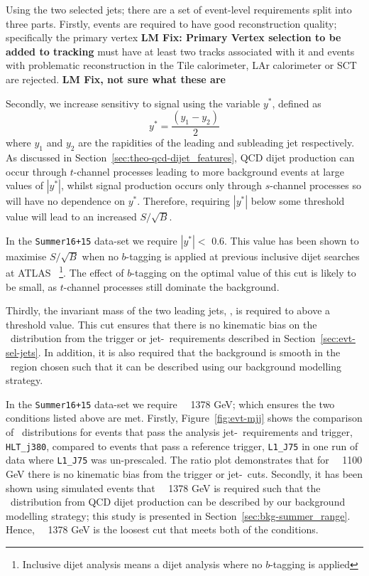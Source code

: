 Using the two selected jets; there are a set of event-level requirements
split into three parts.
Firstly, events are required to have good reconstruction quality;
specifically the primary vertex \textbf{LM Fix: Primary Vertex selection to be added to tracking}
must have at least two tracks associated with it
and events with problematic reconstruction in the Tile calorimeter, LAr calorimeter or SCT are rejected.
\textbf{LM Fix, not sure what these are}

\noindent
Secondly, we increase sensitivy to signal using the 
variable $y^*$, defined as
\begin{equation}
  y^* = \frac{(y_1-y_2)}{2}
\end{equation}
where $y_1$ and $y_2$ are the rapidities of the leading and subleading jet respectively.
As discussed in Section~\ref{sec:theo-qcd-dijet_features}, QCD dijet production can occur through $t$-channel processes leading to more background events at large values of $|y^*|$,
whilst signal production occurs only through $s$-channel processes so will have no dependence on $y^*$.
Therefore, requiring $|y^*|$ below some threshold value will lead to an increased $S/\sqrt{B}$.

In the \verb|Summer16+15| data-set we require $|y^*| <$ 0.6.
This value has been shown to maximise $S/\sqrt{B}$ when no $b$-tagging is applied
at previous inclusive dijet searches at ATLAS~\cite{dijet-mori16_paper}
\footnote{Inclusive dijet analysis means a dijet analysis where no $b$-tagging is applied}.
The effect of $b$-tagging on the optimal value of this cut is likely to be small,
as $t$-channel processes still dominate the background.

Thirdly, the invariant mass of the two leading jets, \mjj, is required to above a threshold value.
This cut ensures that there is no kinematic bias on the \mjj~distribution
from the trigger or jet-\pT~requirements described in Section~\ref{sec:evt-sel-jets}.
In addition, it is also required that the background is smooth in the \mjj~region chosen
such that it can be described using our background modelling strategy.

In the \verb|Summer16+15| data-set we require \mjj~\gt~1378 GeV;
which ensures the two conditions listed above are met.
Firstly, Figure~\ref{fig:evt-mjj} shows the comparison of \mjj~distributions for events
that pass the analysis jet-\pT~requirements and  trigger, \verb|HLT_j380|, compared to events that pass a reference trigger, \verb|L1_J75|
in one run of data where \verb|L1_J75| was un-prescaled.
The ratio plot demonstrates that for \mjj~\gt~1100 GeV there is no kinematic bias from the trigger or jet-\pT~cuts.
Secondly, it has been shown using simulated events that
\mjj~\gt~1378 GeV is required such that the \mjj~distribution from QCD dijet production
can be described by our background modelling strategy;
this study is presented in Section~\ref{sec:bkg-summer_range}.
Hence, \mjj~\gt~1378 GeV is the loosest cut that meets both of the conditions.

